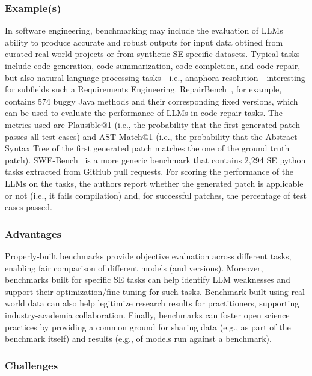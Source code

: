 \subsubsection{Example(s)}

In software engineering, benchmarking may include the evaluation of LLMs ability to produce accurate and robust outputs for input data obtined from curated real-world projects or from synthetic SE-specific datasets. Typical tasks include code generation, code summarization, code completion, and code repair, but also natural-language processing tasks---i.e., anaphora resolution---interesting for subfields such a Requirements Engineering. 
RepairBench~\cite{silva2024repairbench}, for example, contains 574 buggy Java methods and their corresponding fixed versions, which can be used to evaluate the performance of LLMs in code repair tasks.
The metrics used are Plausible@1 (i.e., the probability that the first generated patch passes all test cases) and AST Match@1 (i.e., the probability that the Abstract Syntax Tree of the first generated patch matches the one of the ground truth patch).
SWE-Bench~\cite{DBLP:conf/iclr/JimenezYWYPPN24} is a more generic benchmark that contains 2,294 SE python tasks extracted from GitHub pull requests.
For scoring the performance of the LLMs on the tasks, the authors report whether the generated patch is applicable or not (i.e., it fails compilation) and, for successful patches, the percentage of test cases passed.

\subsubsection{Advantages}

Properly-built benchmarks provide objective evaluation across different tasks, enabling fair comparison of different models (and versions).
Moreover, benchmarks built for specific SE tasks can help identify LLM weaknesses and support their optimization/fine-tuning for such tasks.
Benchmark built using real-world data can also help legitimize research results for practitioners, supporting industry-academia collaboration.
Finally, benchmarks can foster open science practices by providing a common ground for sharing data (e.g., as part of the benchmark itself) and results (e.g., of models run against a benchmark).

\subsubsection{Challenges}

